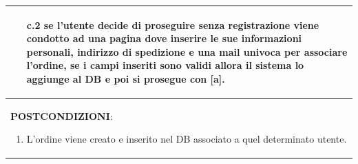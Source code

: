 \documentclass[a4paper,11pt]{report}
\begin{document}
\begin{table}[h!]
\begin{tabularx}{\textwidth}{|X|}
\begin{enumerate}
\begin{itemize}
\begin{itemize}
              \item [c.2] se l'utente decide di proseguire senza registrazione viene condotto ad una pagina dove inserire le sue informazioni personali, indirizzo di spedizione e una mail univoca per associare l'ordine, se i campi inseriti sono validi allora il sistema lo aggiunge al DB e poi si prosegue con [a].
          \end{itemize}
        \end{itemize}
      \end{enumerate} \\
      \hline
      \textbf{POSTCONDIZIONI}:
      \begin{enumerate}
        \item L'ordine viene creato e inserito nel DB associato a quel determinato utente.
      \end{enumerate} \\
      \hline
    \end{tabularx}
  \end{table}
  
 
  
\end{document}
